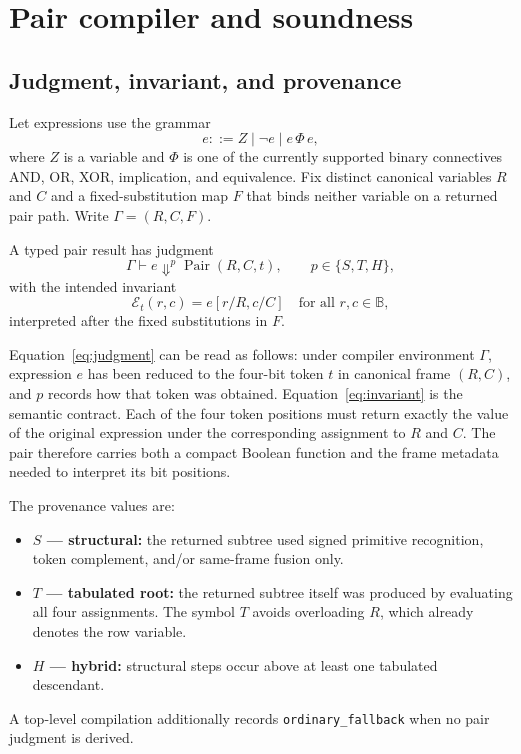 \documentclass[10pt]{article}
\newcommand{\B}{\mathbb B}
\newcommand{\Pair}{\operatorname{Pair}}
\newcommand{\eval}{\mathcal E}
\theoremstyle{plain}
\theoremstyle{definition}
\theoremstyle{remark}
\begin{document}
\section{Pair compiler and soundness}
\label{sec:compiler}

\subsection{Judgment, invariant, and provenance}

Let expressions use the grammar
\begin{equation}
 e ::= Z\mid \neg e\mid e\,\Phi\,e,
 \label{eq:grammar}
\end{equation}
where $Z$ is a variable and $\Phi$ is one of the currently supported binary connectives AND, OR, XOR, implication, and equivalence. Fix distinct canonical variables $R$ and $C$ and a fixed-substitution map $F$ that binds neither variable on a returned pair path. Write $\Gamma=(R,C,F)$.

A typed pair result has judgment
\begin{equation}
 \Gamma\vdash e\Downarrow^p \Pair(R,C,t),
 \qquad p\in\{S,T,H\},
 \label{eq:judgment}
\end{equation}
with the intended invariant
\begin{equation}
 \eval_t(r,c)=e[r/R,c/C]
 \quad\text{for all }r,c\in\B,
 \label{eq:invariant}
\end{equation}
interpreted after the fixed substitutions in $F$.

Equation~\eqref{eq:judgment} can be read as follows: under compiler environment $\Gamma$, expression $e$ has been reduced to the four-bit token $t$ in canonical frame $(R,C)$, and $p$ records how that token was obtained. Equation~\eqref{eq:invariant} is the semantic contract. Each of the four token positions must return exactly the value of the original expression under the corresponding assignment to $R$ and $C$. The pair therefore carries both a compact Boolean function and the frame metadata needed to interpret its bit positions.

The provenance values are:
\begin{itemize}
 \item \textbf{$S$ --- structural:} the returned subtree used signed primitive recognition, token complement, and/or same-frame fusion only.
 \item \textbf{$T$ --- tabulated root:} the returned subtree itself was produced by evaluating all four assignments. The symbol $T$ avoids overloading $R$, which already denotes the row variable.
 \item \textbf{$H$ --- hybrid:} structural steps occur above at least one tabulated descendant.
\end{itemize}
A top-level compilation additionally records \texttt{ordinary\_fallback} when no pair judgment is derived.
\end{document}

